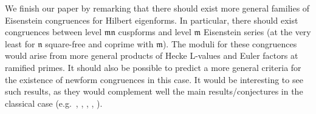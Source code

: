 \documentclass[a4paper,oneside]{amsart}
\theoremstyle{plain}
\theoremstyle{definition}
\begin{document}
\vspace{0.1in}
We finish our paper by remarking that there should exist more general families of Eisenstein congruences for Hilbert eigenforms. In particular, there should exist congruences between level $\mathfrak{m}\mathfrak{n}$ cuspforms and level $\mathfrak{m}$ Eisenstein series (at the very least for $\mathfrak{n}$ square-free and coprime with $\mathfrak{m}$). The moduli for these congruences would arise from more general products of Hecke L-values and Euler factors at ramified primes. It should also be possible to predict a more general criteria for the existence of newform congruences in this case. It would be interesting to see such results, as they would complement well the main results/conjectures in the classical case (e.g.\ \cite{billereymenares}, \cite{billereymenares2}, \cite{dummigan}, \cite{dummiganfretwell} \cite{fretwellroberts}, \cite{spencer}).
\end{document}
